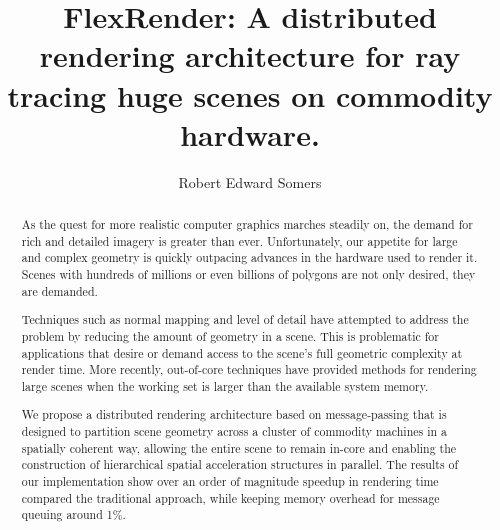 \documentclass[12pt]{ucthesis}
\begin{document}

\title{FlexRender: A distributed rendering architecture for ray tracing huge
scenes on commodity hardware.}
\author{Robert Edward Somers}
  
 
     



\maketitle

\begin{frontmatter}

\copyrightpage

\committeemembershippage

\begin{abstract}

As the quest for more realistic computer graphics marches steadily on, the
demand for rich and detailed imagery is greater than ever. Unfortunately, our
appetite for large and complex geometry is quickly outpacing advances in the
hardware used to render it. Scenes with hundreds of millions or even billions
of polygons are not only desired, they are demanded.

Techniques such as normal mapping and level of detail have attempted to address
the problem by reducing the amount of geometry in a scene. This is problematic
for applications that desire or demand access to the scene's full geometric
complexity at render time. More recently, out-of-core techniques have provided
methods for rendering large scenes when the working set is larger than the
available system memory.

We propose a distributed rendering architecture based on message-passing that
is designed to partition scene geometry across a cluster of commodity machines
in a spatially coherent way, allowing the entire scene to remain in-core and
enabling the construction of hierarchical spatial acceleration structures in
parallel. The results of our implementation show over an order of magnitude
speedup in rendering time compared the traditional approach, while keeping
memory overhead for message queuing around 1\%.


\end{abstract}
\end{frontmatter}
\end{document}
